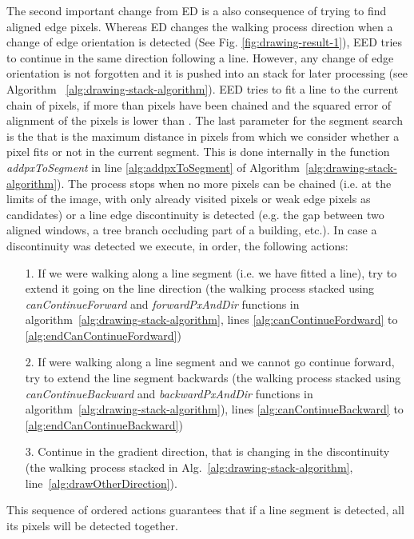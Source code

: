 \documentclass[preprint,12pt]{elsarticle}
\begin{document}
The second important change from ED is a also consequence of trying to find aligned edge pixels. Whereas ED changes the walking process direction when a change of edge orientation is detected (See Fig. \ref{fig:drawing-result-1}), EED tries to continue in the same direction following a line. However, any change of edge orientation is not forgotten and it is pushed into an stack for later processing (see Algorithm~ \ref{alg:drawing-stack-algorithm}).
EED tries to fit a line to the current chain of pixels, if more than  pixels have been chained and the squared error of alignment of the pixels is lower than . The last parameter for the segment search is the   that is the maximum distance in pixels from which we consider whether a pixel fits or not in the current segment. This is done internally in the function \emph{addpxToSegment} in line \ref{alg:addpxToSegment} of Algorithm~\ref{alg:drawing-stack-algorithm}).
The process stops when no more pixels can be chained (i.e. at the limits of the image, with only already visited pixels or weak edge pixels as candidates) or a line edge discontinuity is detected (e.g. the gap between two aligned windows, a tree branch occluding part of a building, etc.). In case a discontinuity was detected we execute, in order, the following actions:
\begin{enumerate}
    \item[1.] If we were walking along a line segment (i.e. we have fitted a line), try to extend it going on the line direction (the walking process stacked using \emph{canContinueForward} and \emph{forwardPxAndDir} functions in algorithm~\ref{alg:drawing-stack-algorithm}, lines \ref{alg:canContinueFordward} to \ref{alg:endCanContinueFordward}) 
    \item[2.] If were walking along a line segment and we cannot go continue forward, try to extend the line segment backwards (the walking process stacked using \emph{canContinueBackward} and \emph{backwardPxAndDir} functions in algorithm~\ref{alg:drawing-stack-algorithm}), lines \ref{alg:canContinueBackward} to \ref{alg:endCanContinueBackward})
    \item[3.] Continue in the gradient direction, that is changing in the discontinuity (the walking process stacked in Alg.~\ref{alg:drawing-stack-algorithm}, line~\ref{alg:drawOtherDirection}).
\end{enumerate}

This sequence of ordered actions guarantees that if a line segment is detected, all its pixels will be detected together. 
\end{document}
